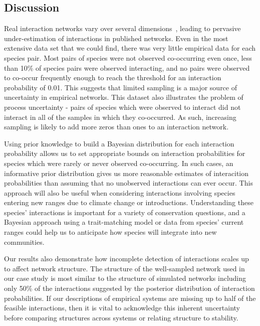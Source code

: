\documentclass[12pt]{article}
\begin{document}
\begin{spacing}{2.0}
\section*{Discussion}

  Real interaction networks vary over several dimensions~\citep{Kitching1987,Olesen2011a,Pires2011a,Baiser2012,Fodrie2015,Novak2015}, leading to pervasive under-estimation of interactions in published networks. Even in the most extensive data set that we could find, there was very little empirical data for each species pair. Most pairs of species were not observed co-occurring even once, less than 10\% of species pairs were observed interacting, and no pairs were observed to co-occur frequently enough to reach the threshold for an interaction probability of 0.01. This suggests that limited sampling is a major source of uncertainty in empirical networks. This dataset also illustrates the problem of process uncertainty - pairs of species which were observed to interact did not interact in all of the samples in which they co-occurred. As such, increasing sampling is likely to add more zeros than ones to an interaction network.


  Using prior knowledge to build a Bayesian distribution for each interaction probability allows us to set appropriate bounds on interaction probabilities for species which were rarely or never observed co-occurring. In such cases, an informative prior distribution gives us more reasonable estimates of interacition probabilities than assuming that no unobserved interactions can ever occur. This approach will also be useful when considering interactions involving species entering new ranges due to climate change or introductions. Understanding these species' interactions is important for a variety of conservation questions, and a Bayesian approach using a trait-matching model or data from species' current ranges could help us to anticipate how species will integrate into new communities. 


  Our results also demonstrate how incomplete detection of interactions scales up to affect network structure. The structure of the well-sampled network used in our case study is most similar to the structure of simulated networks including only 50\% of the interactions suggested by the posterior distribution of interaction probabilities. If our descriptions of empirical systems are missing up to half of the feasible interactions, then it is vital to acknowledge this inherent uncertainty before comparing structures across systems or relating structure to stability.



\end{spacing}
\end{document}
